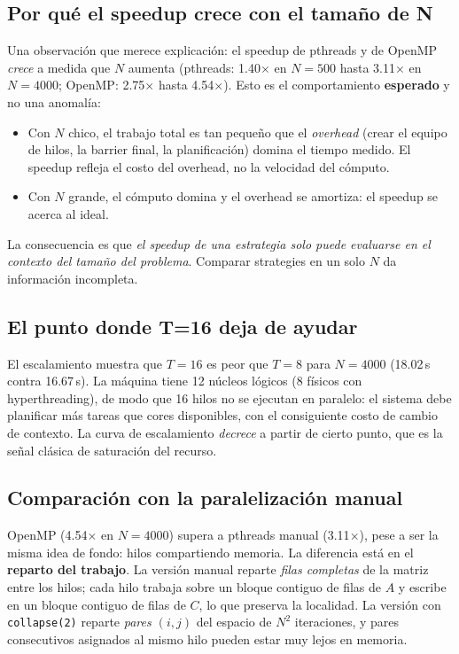 \subsection{Por qué el speedup crece con el tamaño de N}

Una observación que merece explicación: el speedup de pthreads y de OpenMP \emph{crece} a medida que $N$ aumenta (pthreads: 1.40$\times$ en $N=500$ hasta 3.11$\times$ en $N=4000$; OpenMP: 2.75$\times$ hasta 4.54$\times$). Esto es el comportamiento \textbf{esperado} y no una anomalía:

\begin{itemize}
    \item Con $N$ chico, el trabajo total es tan pequeño que el \emph{overhead} (crear el equipo de hilos, la barrier final, la planificación) domina el tiempo medido. El speedup refleja el costo del overhead, no la velocidad del cómputo.
    \item Con $N$ grande, el cómputo domina y el overhead se amortiza: el speedup se acerca al ideal.
\end{itemize}

La consecuencia es que \emph{el speedup de una estrategia solo puede evaluarse en el contexto del tamaño del problema}. Comparar strategies en un solo $N$ da información incompleta.

\subsection{El punto donde T=16 deja de ayudar}

El escalamiento muestra que $T=16$ es peor que $T=8$ para $N=4000$ (18.02\,s contra 16.67\,s). La máquina tiene 12 núcleos lógicos (8 físicos con hyperthreading), de modo que 16 hilos no se ejecutan en paralelo: el sistema debe planificar más tareas que cores disponibles, con el consiguiente costo de cambio de contexto. La curva de escalamiento \emph{decrece} a partir de cierto punto, que es la señal clásica de saturación del recurso.

\subsection{Comparación con la paralelización manual}

OpenMP (4.54$\times$ en $N=4000$) supera a pthreads manual (3.11$\times$), pese a ser la misma idea de fondo: hilos compartiendo memoria. La diferencia está en el \textbf{reparto del trabajo}. La versión manual reparte \emph{filas completas} de la matriz entre los hilos; cada hilo trabaja sobre un bloque contiguo de filas de $A$ y escribe en un bloque contiguo de filas de $C$, lo que preserva la localidad. La versión con \texttt{collapse(2)} reparte \emph{pares $(i,j)$} del espacio de $N^2$ iteraciones, y pares consecutivos asignados al mismo hilo pueden estar muy lejos en memoria.

